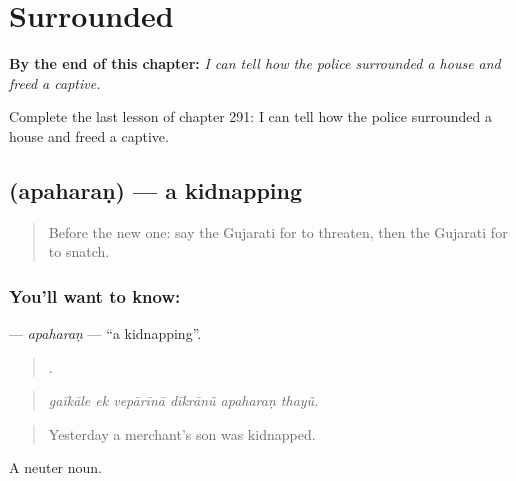 
\chapter{Surrounded}
\label{ch:gu-surrounded}

\begin{chapteropening}
\textbf{By the end of this chapter:} \emph{I can tell how the police surrounded a house and freed a captive.}

Complete the last lesson of chapter 291: I can tell how the police surrounded a house and freed a captive.
\end{chapteropening}

\section[\texorpdfstring{\gu{અપહરણ} (apaharaṇ)}{અપહરણ (apaharaṇ)}]{ (apaharaṇ) — a kidnapping}

\label{lesson:GU-C291-apaharan}



\begin{quote}
Before the new one: say the Gujarati for to threaten, then the Gujarati for to snatch.
\end{quote}

\subsection*{You'll want to know: }
\textbf{} — \emph{apaharaṇ} — \textquotedblleft{}a kidnapping\textquotedblright{}.

\begin{quote}
     .
\end{quote}

\begin{quote}
\emph{gaīkāle ek vepārīnā dīkrānũ apaharaṇ thayũ.}
\end{quote}

\begin{quote}
Yesterday a merchant's son was kidnapped.
\end{quote}

A neuter noun.


